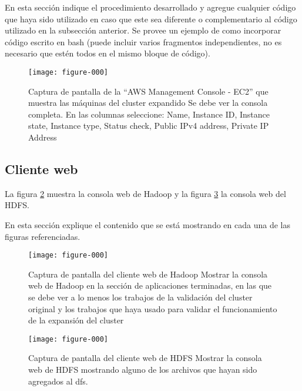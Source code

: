 \documentclass[12pt,letterpaper,twoside]{article}
\begin{document}
{\color{red} En esta sección indique el procedimiento desarrollado y agregue cualquier código que haya sido utilizado en caso que este sea diferente o complementario al código utilizado en la subsección anterior. Se provee un ejemplo de como incorporar código escrito en bash (puede incluir varios fragmentos independientes, no es necesario que estén todos en el mismo bloque de código).}

\begin{code}[H]

\end{code}

\begin{figure}
    \centering
    \texttt{[image: figure-000]}
    \caption{Captura de pantalla de la ``AWS Management Console - EC2'' que muestra las máquinas del cluster expandido
    {\color{red} Se debe ver la consola completa. En las columnas seleccione: Name, Instance ID, Instance state, Instance type, Status check, Public IPv4 address, Private IP Address}}
    \label{fig:002}
\end{figure}

\subsection{Cliente web}

La figura \ref{fig:003} muestra la consola web de Hadoop y la figura \ref{fig:004} la consola web del HDFS.

{\color{red} En esta sección explique el contenido que se está mostrando en cada una de las figuras referenciadas.}

\begin{figure}
    \centering
    \texttt{[image: figure-000]}
    \caption{Captura de pantalla del cliente web de Hadoop
    {\color{red} Mostrar la consola web de Hadoop en la sección de aplicaciones terminadas, en las que se debe ver a lo menos los trabajos de la validación del cluster original y los trabajos que haya usado para validar el funcionamiento de la expansión del cluster}}
    \label{fig:003}
\end{figure}

\begin{figure}
    \centering
    \texttt{[image: figure-000]}
    \caption{Captura de pantalla del cliente web de HDFS
    {\color{red} Mostrar la consola web de HDFS mostrando alguno de los archivos que hayan sido agregados al dfs.}}
    \label{fig:004}
\end{figure}
\end{document}
